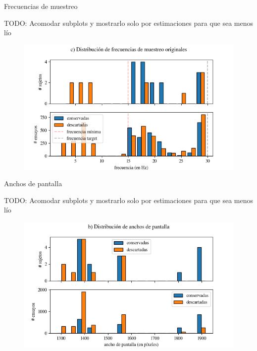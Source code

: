 \documentclass[aspectratio=169]{beamer}
\begin{document}
\begin{frame}{Frecuencias de muestreo}

  TODO: Acomodar subplots y mostrarlo solo por estimaciones para que sea menos
  lío
  \begin{figure}
    \includegraphics[width=0.7\linewidth]{img/second-sampling-frequencies-distribution.png}
  \end{figure}

\end{frame}

\begin{frame}{Anchos de pantalla}

  TODO: Acomodar subplots y mostrarlo solo por estimaciones para que sea menos
  lío
  \begin{figure}
    \includegraphics[width=0.7\linewidth]{img/second-widths-distribution.png}
  \end{figure}

\end{frame}
\end{document}
